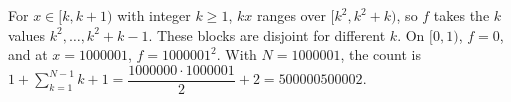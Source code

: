 For $x\in[k,k+1)$ with integer $k\ge1$, $kx$ ranges over $[k^2,k^2+k)$, so $f$ takes the $k$ values $k^2,\dots,k^2+k-1$. These blocks are disjoint for different $k$. On $[0,1)$, $f=0$, and at $x=1000001$, $f=1000001^2$. With $N=1000001$, the count is $1+\displaystyle\sum_{k=1}^{N-1}k+1=\dfrac{1000000\cdot1000001}2+2=\boxed{500000500002}$.
